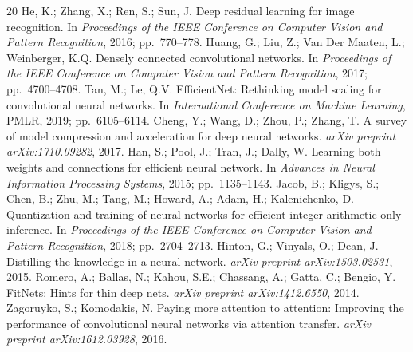 \documentclass[symmetry,article,submit,pdftex,moreauthors]{Definitions/mdpi}
\begin{document}


\begin{thebibliography}{20}
 He, K.; Zhang, X.; Ren, S.; Sun, J. Deep residual learning for image recognition. In \textit{Proceedings of the IEEE Conference on Computer Vision and Pattern Recognition}, 2016; pp.~770--778.
 Huang, G.; Liu, Z.; Van Der Maaten, L.; Weinberger, K.Q. Densely connected convolutional networks. In \textit{Proceedings of the IEEE Conference on Computer Vision and Pattern Recognition}, 2017; pp.~4700--4708.
 Tan, M.; Le, Q.V. EfficientNet: Rethinking model scaling for convolutional neural networks. In \textit{International Conference on Machine Learning}, PMLR, 2019; pp.~6105--6114.
 Cheng, Y.; Wang, D.; Zhou, P.; Zhang, T. A survey of model compression and acceleration for deep neural networks. \textit{arXiv preprint arXiv:1710.09282}, 2017.
 Han, S.; Pool, J.; Tran, J.; Dally, W. Learning both weights and connections for efficient neural network. In \textit{Advances in Neural Information Processing Systems}, 2015; pp.~1135--1143.
 Jacob, B.; Kligys, S.; Chen, B.; Zhu, M.; Tang, M.; Howard, A.; Adam, H.; Kalenichenko, D. Quantization and training of neural networks for efficient integer-arithmetic-only inference. In \textit{Proceedings of the IEEE Conference on Computer Vision and Pattern Recognition}, 2018; pp.~2704--2713.
 Hinton, G.; Vinyals, O.; Dean, J. Distilling the knowledge in a neural network. \textit{arXiv preprint arXiv:1503.02531}, 2015.
 Romero, A.; Ballas, N.; Kahou, S.E.; Chassang, A.; Gatta, C.; Bengio, Y. FitNets: Hints for thin deep nets. \textit{arXiv preprint arXiv:1412.6550}, 2014.
 Zagoruyko, S.; Komodakis, N. Paying more attention to attention: Improving the performance of convolutional neural networks via attention transfer. \textit{arXiv preprint arXiv:1612.03928}, 2016.

\end{thebibliography}
\end{document}
